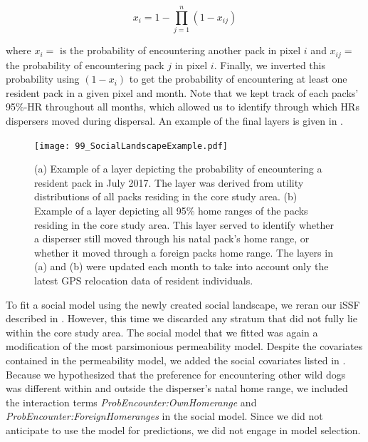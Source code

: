 \documentclass[abstract=on,10pt,a4paper,bibliography=totocnumbered]{scrartcl}
\begin{document}
\begin{equation}
\label{EQ4}
x_i = 1 - \prod_{j = 1}^{n} (1 - x_{ij})
\end{equation}

\noindent where \(x_i =\) is the probability of encountering another pack in
pixel \(i\) and \(x_{ij} =\) the probability of encountering pack \(j\) in pixel
\(i\). Finally, we inverted this probability using \((1-x_i)\) to get the
probability of encountering at least one resident pack in a given pixel and
month. Note that we kept track of each packs' 95\%-HR throughout all months,
which allowed us to identify through which HRs dispersers moved during
dispersal. An example of the final layers is given in
.

\begin{figure}[h]
  \begin{center}
    \texttt{[image: 99\_SocialLandscapeExample.pdf]}
    \caption{(a) Example of a layer depicting the probability of encountering a
    resident pack in July 2017. The layer was derived from utility distributions
    of all packs residing in the core study area. (b) Example of a layer
    depicting all 95\% home ranges of the packs residing in the core study area.
    This layer served to identify whether a disperser still moved through his
    natal pack's home range, or whether it moved through a foreign packs home
    range. The layers in (a) and (b) were updated each month to take into
    account only the latest GPS relocation data of resident individuals.}
    \label{SocialLandscapeExample}
  \end{center}
\end{figure}

\noindent To fit a social model using the newly created social landscape, we
reran our iSSF described in . However, this time we discarded any
stratum that did not fully lie within the core study area. The social model that
we fitted was again a modification of the most parsimonious permeability model.
Despite the covariates contained in the permeability model, we added the social
covariates listed in . Because we hypothesized that the
preference for encountering other wild dogs was different within and outside the
disperser's natal home range, we included the interaction terms
\textit{ProbEncounter:OwnHomerange} and \textit{ProbEncounter:ForeignHomeranges}
in the social model. Since we did not anticipate to use the model for
predictions, we did not engage in model selection.
\end{document}

